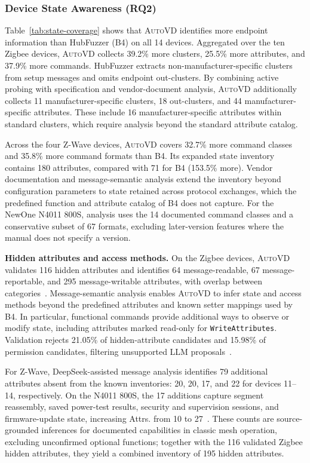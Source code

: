 \documentclass[10pt,journal,compsoc]{IEEEtran}
\newcommand{\system}{\textsc{AutoVD}}
\DeclareRobustCommand{\rq}[1]{\textcolor{rqcolor}{\textbf{RQ#1}}}
\newcommand{\parab}[1]{\vspace{0.04in}\noindent\textbf{#1}}
\begin{document}
\subsubsection{Device State Awareness (\rq{2})}
Table~\ref{tab:state-coverage} shows that \system{} identifies more endpoint information than HubFuzzer (B4) on all 14 devices. Aggregated over the ten Zigbee devices, \system{} collects 39.2\% more clusters, 25.5\% more attributes, and 37.9\% more commands. HubFuzzer extracts non-manufacturer-specific clusters from setup messages and omits endpoint out-clusters. By combining active probing with specification and vendor-document analysis, \system{} additionally collects 11 manufacturer-specific clusters, 18 out-clusters, and 44 manufacturer-specific attributes. These include 16 manufacturer-specific attributes within standard clusters, which require analysis beyond the standard attribute catalog.

Across the four Z-Wave devices, \system{} covers 32.7\% more command classes and 35.8\% more command formats than B4. Its expanded state inventory contains 180 attributes, compared with 71 for B4 (153.5\% more). Vendor documentation and message-semantic analysis extend the inventory beyond configuration parameters to state retained across protocol exchanges, which the predefined function and attribute catalog of B4 does not capture. For the NewOne N4011 800S, analysis uses the 14 documented command classes and a conservative subset of 67 formats, excluding later-version features where the manual does not specify a version.

\parab{Hidden attributes and access methods.}
On the Zigbee devices, \system{} validates 116 hidden attributes and identifies 64 message-readable, 67 message-reportable, and 295 message-writable attributes, with overlap between categories~\cite{zvdetector}. Message-semantic analysis enables \system{} to infer state and access methods beyond the predefined attributes and known setter mappings used by B4. In particular, functional commands provide additional ways to observe or modify state, including attributes marked read-only for \texttt{WriteAttributes}. Validation rejects 21.05\% of hidden-attribute candidates and 15.98\% of permission candidates, filtering unsupported LLM proposals~\cite{zvdetector}. 

For Z-Wave, DeepSeek-assisted message analysis identifies 79 additional attributes absent from the known inventories: 20, 20, 17, and 22 for devices 11--14, respectively. On the N4011 800S, the 17 additions capture segment reassembly, saved power-test results, security and supervision sessions, and firmware-update state, increasing Attrs. from 10 to 27~\cite{zwaveapp2024b}. These counts are source-grounded inferences for documented capabilities in classic mesh operation, excluding unconfirmed optional functions; together with the 116 validated Zigbee hidden attributes, they yield a combined inventory of 195 hidden attributes.
\end{document}
